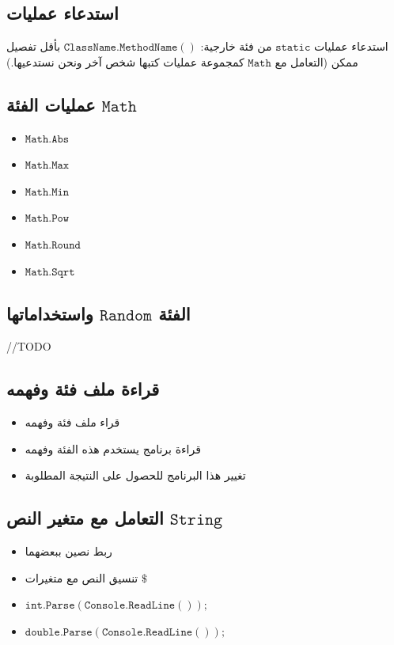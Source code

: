 ﻿\documentclass[14pt]{extarticle}
\begin{document}
\subsection{استدعاء عمليات}

استدعاء عمليات $\mathtt{static}$ من فئة خارجية: $\mathtt{ClassName.MethodName()}$ بأقل تفصيل ممكن (التعامل مع $\mathtt{Math}$ كمجموعة عمليات كتبها شخص آخر ونحن نستدعيها.)

\subsection{عمليات الفئة $\mathtt{Math}$}
\begin{itemize}
    \item $\mathtt{Math.Abs}$
    \item $\mathtt{Math.Max}$
    \item $\mathtt{Math.Min}$
    \item $\mathtt{Math.Pow}$
    \item $\mathtt{Math.Round}$
    \item $\mathtt{Math.Sqrt}$
\end{itemize}

\subsection{الفئة $\mathtt{Random}$ واستخداماتها}

//TODO

\subsection{قراءة ملف فئة وفهمه}
\begin{itemize}
    \item قراء ملف فئة وفهمه
    \item قراءة برنامج يستخدم هذه الفئة وفهمه
    \item تغيير هذا البرنامج للحصول على النتيجة المطلوبة
\end{itemize}

\subsection{التعامل مع متغير النص $\mathtt{String}$}

\begin{itemize}
    \item ربط نصين ببعضهما
    \item تنسيق النص مع متغيرات $\mathtt{\$}$
    \item $\mathtt{int.Parse(Console.ReadLine());}$
    \item $\mathtt{double.Parse(Console.ReadLine());}$
\end{itemize}
\end{document}
